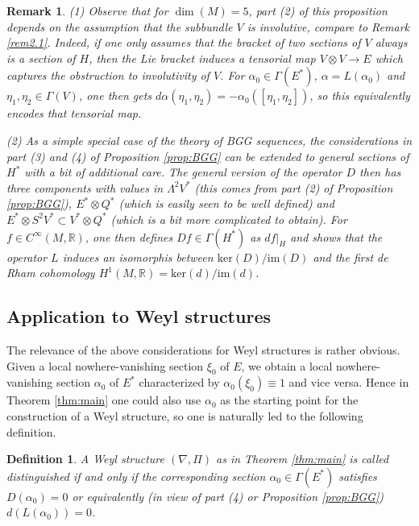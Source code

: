 \documentclass[11pt]{amsart}
\newtheorem{definition}[proposition]{Definition}
\newtheorem{remark}[proposition]{Remark}
\numberwithin{proposition}{section}
\numberwithin{equation}{section}
\begin{document}
\begin{remark}
(1)  Observe that for $\dim(M)=5$, part (2) of this proposition depends on the assumption that the subbundle $V$ is involutive, compare to Remark \ref{rem2.1}. Indeed, if one only assumes that the bracket of two sections of $V$ always is a section of $H$, then the Lie bracket induces a tensorial map $V\otimes V\to E$ which captures the obstruction to involutivity of $V$. For $\alpha_0\in\Gamma(E^*)$, $\alpha=L(\alpha_0)$ and $\eta_1,\eta_2\in\Gamma(V)$, one then gets $d\alpha(\eta_1,\eta_2)=-\alpha_0([\eta_1,\eta_2])$, so this equivalently encodes that tensorial map.  

(2) As a simple special case of the theory of BGG sequences, the considerations in part (3) and (4) of Proposition \ref{prop:BGG} can be extended to general sections of $H^*$ with a bit of additional care. The general version of the operator $D$ then has three components with values in $\Lambda^2V^*$ (this comes from part (2) of Proposition \ref{prop:BGG}), $E^*\otimes Q^*$ (which is easily seen to be well defined) and $E^*\otimes S^2V^*\subset V^*\otimes Q^*$ (which is a bit more complicated to obtain). For $f\in C^\infty(M,\mathbb R)$, one then defines $Df\in\Gamma(H^*)$ as $df|_H$ and shows that the operator $L$ induces an isomorphis between $\text{ker}(D)/\text{im}(D)$ and the first de Rham cohomology $H^1(M,\mathbb R)=\text{ker}(d)/\text{im}(d)$. 
  \end{remark}

  \subsection{Application to Weyl structures}\label{dist-Weyl}
  The relevance of the above considerations for Weyl structures is rather obvious. Given a local nowhere-vanishing section $\xi_0$ of $E$, we obtain a local nowhere-vanishing section $\alpha_0$ of $E^*$ characterized by $\alpha_0(\xi_0)\equiv 1$ and vice versa. Hence in Theorem \ref{thm:main} one could also use $\alpha_0$ as the starting point for the construction of a Weyl structure, so one is naturally led to the following definition. 

\begin{definition}
A Weyl structure $(\nabla,\Pi)$ as in Theorem \ref{thm:main} is called \textit{distinguished} if and only if the corresponding section $\alpha_0\in\Gamma(E^*)$ satisfies $D(\alpha_0)=0$ or equivalently (in view of part (4) or Proposition \ref{prop:BGG}) $d(L(\alpha_0))=0$. 
\end{definition}
\end{document}
